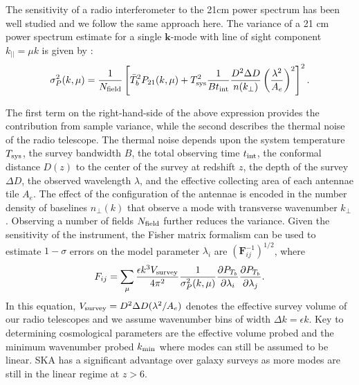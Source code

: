 \documentclass{PoS}
\begin{document}
The sensitivity of a radio interferometer to the 21cm power spectrum has been well studied \cite[e.g.][]{bowman2006, 2006ApJ...653..815M,2008PhRvD..78b3529M,2013ExA....36..235M} and we follow the same approach here. The variance of a 21 cm power spectrum estimate for a single
$\mathbf{k}$-mode with line of sight component $k_{||}=\mu k$ is given by \citep{2008ApJ...680..962L}:
\begin{equation}
\sigma_P^2(k,\mu)= \frac{1}{N_{\rm field}}\left[\bar{T}_b^2P_{21}(k,\mu)+T_{\rm sys}^2\frac{1}{B t_{\rm int}}\frac{D^2\Delta D}{n(k_\perp)}\left(\frac{\lambda^2}{A_e}\right)^2\right]^2.
\end{equation}

The first term on the right-hand-side
of the above expression provides the contribution from sample variance,
while the second describes the thermal noise of the radio telescope.  The
thermal noise depends upon the system temperature $T_{\rm sys}$, the survey
bandwidth $B$, the total observing time $t_{\rm int}$, the conformal
distance $D(z)$ to the center of the survey at redshift $z$, the depth of
the survey $\Delta D$, the observed wavelength $\lambda$, and the effective
collecting area of each antennae tile $A_e$.  The effect of the
configuration of the antennae is encoded in the number density of baselines
$n_\perp(k)$ that observe a mode with transverse wavenumber $k_\perp$
\citep{2006ApJ...653..815M}.  Observing a number of fields $N_{\rm field}$ further reduces the variance. Given the sensitivity of the instrument, the Fisher matrix formalism can be used to estimate $1-\sigma$ errors on the model parameter $\lambda_i$ are $(\mathbf{F}_{ij}^{-1})^{1/2}$, where 
\begin{equation}
F_{ij}=\sum_{\rm \mu} \frac{\epsilon k^3 V_{\rm survey}}{4\pi^2}\frac{1}{\sigma_P^2(k,\mu)}\frac{\partial P_{T_b}}{\partial \lambda_i}\frac{\partial P_{T_b}}{\partial \lambda_j}.
\end{equation}
In this equation, $V_{\rm survey}=D^2\Delta D(\lambda^2/A_e)$ denotes the
effective survey volume of our radio telescopes and we assume wavenumber
bins of width $\Delta k=\epsilon k$.  Key to determining cosmological parameters are the effective volume probed and the minimum wavenumber probed $k_{\rm min}$ where modes can still be assumed to be linear. SKA has a significant advantage over galaxy surveys as more modes are still in the linear regime at $z>6$. 
\end{document}
